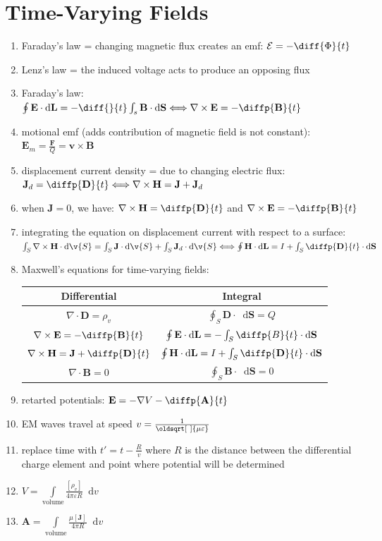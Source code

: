 \documentclass[a4paper,11pt]{article}
\renewcommand*{\sqrt}[2][\ ]{\oldsqrt[#1]{#2}}
\newcommand*\dd{\mathop{}\!\mathrm{d}}
\newcommand{\grad}{\nabla}
\newcommand{\divr}{\nabla \cdot}
\newcommand{\curl}{\nabla \times}
\newcommand{\bvec}[1]{\mathbf{#1}}
\begin{document}
	\section{Time-Varying Fields}
	\begin{enumerate}
		\item Faraday's law = changing magnetic flux creates an emf: $\mathcal{E} = -\diff{\Phi}{t}$
		\item Lenz's law = the induced voltage acts to produce an opposing flux 
		\item Faraday's law: $\oint \bvec{E}\cdot\dd\bvec{L} = -\diff{}{t}\int_s\bvec{B}\cdot\dd\bvec{S} \Longleftrightarrow \curl\bvec{E} = -\diffp{\bvec{B}}{t}$
		\item motional emf (adds contribution of magnetic field is not constant): $\bvec{E}_m = \frac{\bvec{F}}{Q} = \bvec{v}\times\bvec{B}$
		\item displacement current density = due to changing electric flux: $\bvec{J}_d = \diffp{\bvec{D}}{t} \Longleftrightarrow \curl\bvec{H} = \bvec{J} + \bvec{J}_d$
		\item when $\bvec{J} = 0$, we have: $\curl\bvec{H} = \diffp{\bvec{D}}{t}$ and $\curl\bvec{E} = -\diffp{\bvec{B}}{t}$
		\item integrating the equation on displacement current with respect to a surface: $\int_S \curl\bvec{H} \cdot\dd\v{S} = \int_S \bvec{J} \cdot\dd\v{S} + \int_S \bvec{J}_d \cdot\dd\v{S} \Longleftrightarrow \oint \bvec{H}\cdot\dd\bvec{L} = I + \int_S \diffp{\bvec{D}}{t}\cdot\dd\bvec{S}$
		\item Maxwell's equations for time-varying fields: \\
		\begin{center}
			\begin{tabular}{|c|c|}
				\hline
				Differential & Integral \\ \hline
				$\divr \bvec{D} = \rho_v$ & $\oint_S \bvec{D} \cdot \dd\bvec{S} = Q$ \\
				$\curl \bvec{E} = -\diffp{\bvec{B}}{t}$ & $\oint \bvec{E} \cdot \dd \bvec{L} = -\int_S \diffp{B}{t}\cdot\dd\bvec{S}$\\
				$\curl \bvec{H} = \bvec{J} + \diffp{\bvec{D}}{t}$ & $\oint \bvec{H} \cdot \dd \bvec{L} = I + \int_S \diffp{\bvec{D}}{t}\cdot\dd\bvec{S}$\\
				$\divr \bvec{B} = 0$ & $\oint_S \bvec{B} \cdot \dd \bvec{S} = 0$ \\ \hline
			\end{tabular}
		\end{center}
		\item retarted potentials: $\bvec{E} = -\grad V - \diffp{\bvec{A}}{t}$
		\item EM waves travel at speed $v = \frac{1}{\sqrt{\mu\varepsilon}}$
		\item replace time with $t' = t - \frac{R}{v}$ where $R$ is the distance between the differential charge element and point where potential will be determined
		\item $V = \int\limits_\text{volume} \frac{[\rho_v]}{4\pi\varepsilon R} \dd v$
		\item $\bvec{A} = \int\limits_\text{volume} \frac{\mu[\bvec{J}]}{4\pi R} \dd v$
	\end{enumerate}
\end{document}
